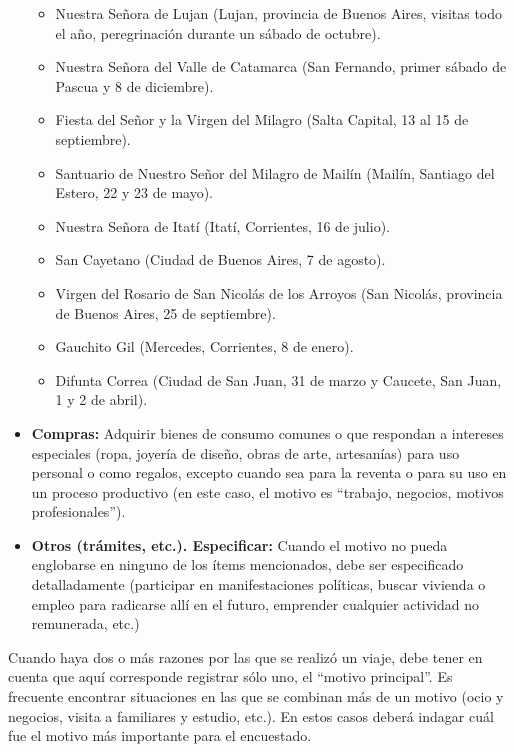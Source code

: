 \documentclass[
  openany]{book}
\begin{document}
\begin{itemize}
  \begin{itemize}
  \item
    Nuestra Señora de Lujan (Lujan, provincia de Buenos Aires, visitas todo el año, peregrinación durante un sábado de octubre).
  \item
    Nuestra Señora del Valle de Catamarca (San Fernando, primer sábado de Pascua y 8 de diciembre).
  \item
    Fiesta del Señor y la Virgen del Milagro (Salta Capital, 13 al 15 de septiembre).
  \item
    Santuario de Nuestro Señor del Milagro de Mailín (Mailín, Santiago del Estero, 22 y 23 de mayo).
  \item
    Nuestra Señora de Itatí (Itatí, Corrientes, 16 de julio).\\
  \item
    San Cayetano (Ciudad de Buenos Aires, 7 de agosto).\\
  \item
    Virgen del Rosario de San Nicolás de los Arroyos (San Nicolás, provincia de Buenos Aires, 25 de septiembre).
  \item
    Gauchito Gil (Mercedes, Corrientes, 8 de enero).\\
  \item
    Difunta Correa (Ciudad de San Juan, 31 de marzo y Caucete, San Juan, 1 y 2 de abril).\\
  \end{itemize}
\item
  \textbf{Compras:} Adquirir bienes de consumo comunes o que respondan a intereses especiales (ropa, joyería de diseño, obras de arte, artesanías) para uso personal o como regalos, excepto cuando sea para la reventa o para su uso en un proceso productivo (en este caso, el motivo es ``trabajo, negocios, motivos profesionales'').
\item
  \textbf{Otros (trámites, etc.). Especificar:} Cuando el motivo no pueda englobarse en ninguno de los ítems mencionados, debe ser especificado detalladamente (participar en manifestaciones políticas, buscar vivienda o empleo para radicarse allí en el futuro, emprender cualquier actividad no remunerada, etc.)
\end{itemize}

Cuando haya dos o más razones por las que se realizó un viaje, debe tener en cuenta que aquí corresponde registrar sólo uno, el ``motivo principal''. Es frecuente encontrar situaciones en las que se combinan más de un motivo (ocio y negocios, visita a familiares y estudio, etc.). En estos casos deberá indagar cuál fue el motivo más importante para el encuestado.
\end{document}
